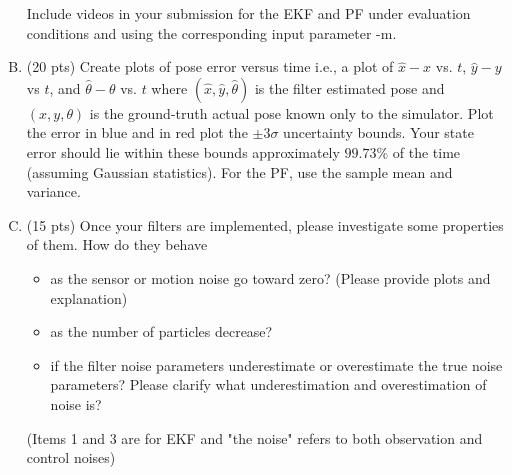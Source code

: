 \documentclass[11pt, oneside, letterpaper]{article}
\begin{document}
\begin{enumerate}[A.]
  Include videos in your submission for the EKF and PF under evaluation  conditions  and  using the corresponding input parameter -m.

\item (20 pts) Create plots of pose error versus time i.e., a plot of   $\hat{x}-x$ vs. $t$, $\hat{y}-y$ vs $t$, and $\hat{\theta}-\theta$ vs. $t$   where $(\hat{x},\hat{y},\hat{\theta})$ is the filter estimated pose and   $(x,y,\theta)$ is the ground-truth actual pose known only to the simulator.   Plot the error in blue and in red plot the $\pm 3\sigma$ uncertainty bounds.   Your state error should lie within these bounds approximately $99.73\%$ of   the time (assuming Gaussian statistics).  For the PF, use the sample mean   and variance.


\item (15 pts) Once your filters are implemented, please investigate some   properties of them. How do they behave
  \begin{itemize}
  \item as the sensor or motion noise go toward zero? (Please provide plots and explanation)
  \item as the number of particles decrease?
  \item if the filter noise parameters underestimate or overestimate the true noise parameters? Please clarify what underestimation and overestimation of noise is?
  \end{itemize}
(Items 1 and 3 are for EKF and "the noise" refers to both observation and control noises)

\end{enumerate}
\end{document}
